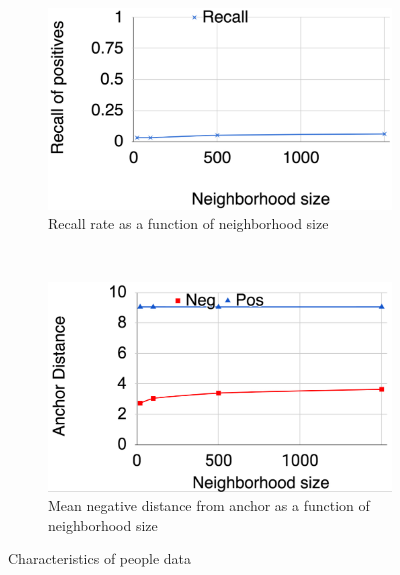 \begin{figure}[htb]
    \centering
    \begin{subfigure}[t]{0.5\textwidth}
        \centering
        \includegraphics[width=.9\linewidth]{people_recall}
        \caption{Recall rate as a function of neighborhood size}
        \label{people_recall}
    \end{subfigure}%
    ~ 
    \begin{subfigure}[t]{0.5\textwidth}
        \centering 
        \includegraphics[width=.9\linewidth]{people_distances}
        \caption{Mean negative distance from anchor as a function of neighborhood size}
        \label{modified_loss}
    \end{subfigure}
    \label{people_distances}
    \caption{Characteristics of people data}
\label{people_characteristics}
\end{figure}


